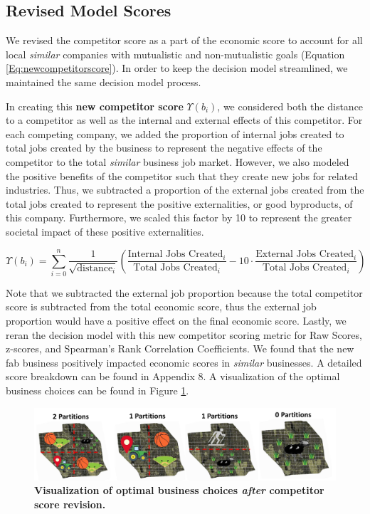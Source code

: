 \documentclass{mcmthesis}
\begin{document}
\subsection{Revised Model Scores}
We revised the competitor score as a part of the economic score to account for all local \textit{similar} companies with mutualistic and non-mutualistic goals (Equation 
\ref{Eq:newcompetitorscore}). In order to keep the decision model streamlined, we maintained the same decision model process. 

In creating this \textbf{new competitor score} $\Upsilon(b_i)$, we considered both the distance to a competitor as well as the internal and external effects of this competitor. For each competing company, we added the proportion of internal jobs created to total jobs created by the business to represent the negative effects of the competitor to the total \textit{similar} business job market. However, we also modeled the positive benefits of the competitor such that they create new jobs for related industries. Thus, we subtracted a proportion of the external jobs created from the total jobs created to represent the positive externalities, or good byproducts, of this company. Furthermore, we scaled this factor by 10 to represent the greater societal impact of these positive externalities. 

\begin{equation}
    \Upsilon(b_i) = \sum_{i=0}^n \frac{1}{\sqrt{\text{distance}_i}} \left(\frac{\text{Internal Jobs Created}_i}{\text{Total Jobs Created}_i} - 10 \cdot \frac{\text{External Jobs Created}_i}{\text{Total Jobs Created}_i}\right)
    \label{Eq:newcompetitorscore}
\end{equation}

Note that we subtracted the external job proportion because the total competitor score is subtracted from the total economic score, thus the external job proportion would have a positive effect on the final economic score. Lastly, we reran the decision model with this new competitor scoring metric for Raw Scores, z-scores, and Spearman's Rank Correlation Coefficients. We found that the new fab business positively impacted economic scores in \textit{similar} businesses. A detailed score breakdown can be found in Appendix 8. A visualization of the optimal business choices can be found in Figure \ref{fig:businessnewcompetitorallocations}.

\begin{figure}[!htbp]
    \centering
    \includegraphics[scale=0.6]{figures/competitorsfigures.pdf}
    \caption{\textbf{Visualization of optimal business choices \textit{after} competitor score revision.}}
    \label{fig:businessnewcompetitorallocations}
\end{figure}
\end{document}
